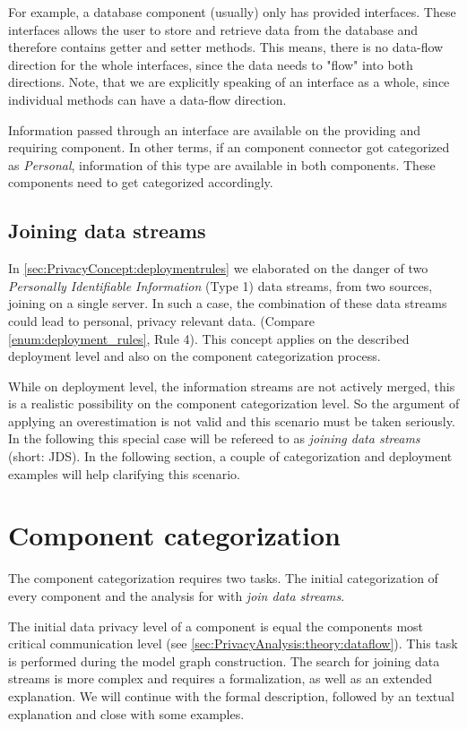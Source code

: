 For example, a database component (usually) only has provided interfaces. These interfaces allows the user to store and retrieve data from the database and therefore contains getter and setter methods. This means, there is no data-flow direction for the whole interfaces, since the data needs to "flow" into both directions. Note, that we are explicitly speaking of an interface as a whole, since individual methods can have a data-flow direction.

Information passed through an interface are available on the providing and requiring component. In other terms, if an component connector got categorized as \textit{Personal}, information of this type are available in both components. These components need to get categorized accordingly.

\subsection{Joining data streams}
\label{sec:PrivacyAnalysis:theory:jds}
In \autoref{sec:PrivacyConcept:deploymentrules} we elaborated on the danger of two \textit{Personally Identifiable Information} (Type 1) data streams, from two sources, joining on a single server. In such a case, the combination of these data streams could lead to personal, privacy relevant data. (Compare \autoref{enum:deployment_rules}, Rule 4). This concept applies on the described deployment level and also on the component categorization process.

While on deployment level, the information streams are not actively merged, this is a realistic possibility on the component categorization level. So the argument of applying an overestimation is not valid and this scenario must be taken seriously. In the following this special case will be refereed to as \textit{joining data streams} (short: JDS). In the following section, a couple of categorization and deployment examples will help clarifying this scenario.


\section{Component categorization}
\label{sec:PrivacyAnalysis:categorization}

The component categorization requires two tasks. The initial categorization of every component and the analysis for with \textit{join data streams}.

The initial data privacy level of a component is equal the components most critical communication level (see \autoref{sec:PrivacyAnalysis:theory:dataflow}). This task is performed during the model graph construction. The search for joining data streams is more complex and requires a formalization, as well as an extended explanation. We will continue with the formal description, followed by an textual explanation and close with some examples.

